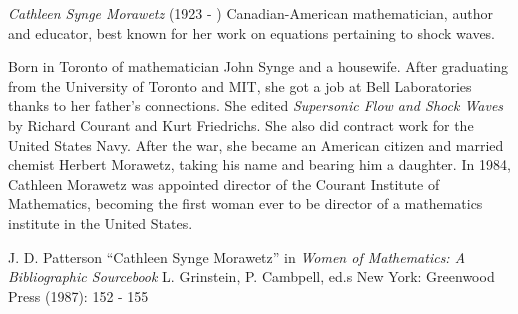 \documentclass[12pt]{article}
\begin{document}

\emph{Cathleen Synge Morawetz} (1923 - ) Canadian-American mathematician, author and educator, best known for her work on equations pertaining to shock waves.

Born in Toronto of mathematician John Synge and a housewife. After graduating from the University of Toronto and MIT, she got a job at Bell Laboratories thanks to her father's connections. She edited {\it Supersonic Flow and Shock Waves} by Richard Courant and Kurt Friedrichs. She also did contract work for the United States Navy. After the war, she became an American citizen and married chemist Herbert Morawetz, taking his name and bearing him a daughter. In 1984, Cathleen Morawetz was appointed director of the Courant Institute of Mathematics, becoming the first woman ever to be director of a mathematics institute in the United States.

\begin{thebibliography}{1}
 J. D. Patterson ``Cathleen Synge Morawetz'' in {\it Women of Mathematics: A Bibliographic Sourcebook} L. Grinstein, P. Cambpell, ed.s New York: Greenwood Press (1987): 152 - 155
\end{thebibliography}

\end{document}
